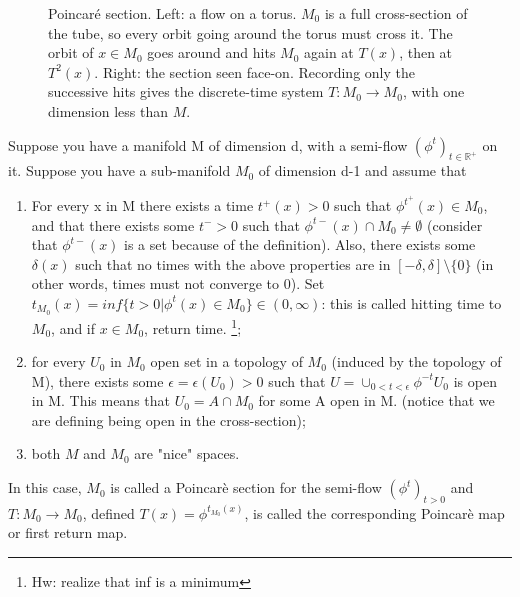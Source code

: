 \begin{figure}[ht]
    \caption{Poincar\'e section. Left: a flow on a torus. $M_0$ is a full cross-section of the tube,
    so every orbit going around the torus must cross it. The orbit of $x\in M_0$ goes around and hits
    $M_0$ again at $T(x)$, then at $T^2(x)$. Right: the section seen face-on. Recording only
    the successive hits gives the discrete-time system $T:M_0\to M_0$, with one dimension less than $M$.}
    \label{fig:poincare_section}
\end{figure}
\begin{definition}
    Suppose you have a manifold M of dimension d, with a semi-flow $(\phi^t)_{t\in\mathbb{R}^+}$ on it. Suppose you have a sub-manifold $M_0$ of dimension d-1 and assume that\begin{enumerate}
    \item For every x in M there exists a time $t^+(x)>0$ such that $\phi^{t^+}(x)\in M_0$, and that there exists some $t^{-}>0$ such that $\phi^{t-}(x)\cap M_0\neq \emptyset$ (consider that $\phi^{t-}(x)$ is a set because of the definition). Also, there exists some $\delta(x)$ such that no times with the above properties are in $[-\delta, \delta]\setminus\{0\}$ (in other words, times must not converge to 0). Set $t_{M_0}(x)=inf\{t>0|\phi^t(x)\in M_0\}\in(0,\infty)$: this is called hitting time to $M_0$, and if $x\in M_0$, return time. \footnote{Hw: realize that inf is a minimum};
    \item for every $U_0$ in $M_0$ open set in a topology of $M_0$ (induced by the topology of M), there exists some $\epsilon=\epsilon(U_0)>0$ such that $U=\cup_{0<t<\epsilon}\phi^{-t}U_0$ is open in M. This means that $U_0=A\cap M_0$ for some A open in M. (notice that we are defining being open in the cross-section);
    \item both $M$ and $M_0$ are "nice" spaces. 
\end{enumerate}

In this case, $M_0$ is called a Poincarè section for the semi-flow $(\phi^t)_{t>0}$ and $T:M_0\rightarrow M_0$, defined $T(x)=\phi^{t_{M_0}(x)}$, is called the corresponding Poincarè map or first return map.
\end{definition}

